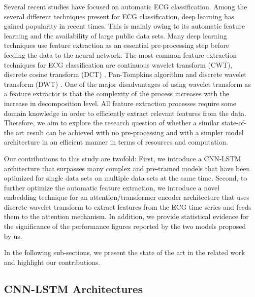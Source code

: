 \documentclass{ieeeaccess}
\begin{document}
Several recent studies have focused on automatic ECG classification. Among the several different techniques present for ECG classification, deep learning has gained popularity in recent times. This is mainly owing to its automatic feature learning and the availability of large public data sets. Many deep learning techniques use feature extraction as an essential pre-processing step before feeding the data to the neural network. 
The most common feature extraction techniques for ECG classification are continuous wavelet transform (CWT), discrete cosine transform (DCT) \cite{article2}, Pan-Tompkins algorithm \cite{7019490} and discrete wavelet transform (DWT) {\cite{article}}. One of the major disadvantages of using wavelet transform as a feature extractor is that the complexity of the process increases with the increase in decomposition level. All feature extraction processes require some domain knowledge in order to efficiently extract relevant features from the data. Therefore, we aim to explore the research question of whether a similar state-of-the art result can be achieved with no pre-processing and with a simpler model architecture in an efficient manner in terms of resources and computation. 

Our contributions to this study are twofold: First, we introduce a CNN-LSTM architecture that surpasses many complex and pre-trained  models that have been optimized for single data sets on multiple data sets at the same time. Second, to further optimize the automatic feature extraction, we introduce a novel embedding technique for an attention/transformer encoder architecture that uses discrete wavelet transform to extract features from the ECG time series and feeds them to the attention mechanism. In addition, we provide statistical evidence for the significance of the performance figures reported by the two models proposed by us.

In the following sub-sections, we present the state of the art in the related work and highlight our contributions.

\subsection{CNN-LSTM Architectures}
\end{document}
